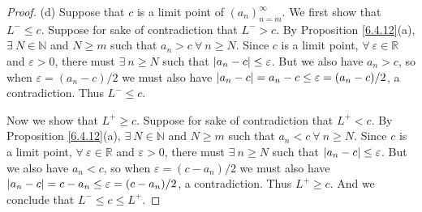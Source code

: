 \begin{proof}{(d)}
Suppose that \(c\) is a limit point of \((a_n)_{n = m}^\infty\).
We first show that \(L^- \leq c\).
Suppose for sake of contradiction that \(L^- > c\).
By Proposition \ref{6.4.12}(a), \(\exists\ N \in \mathds{N}\) and \(N \geq m\) such that \(a_n > c \ \forall\ n \geq N\).
Since \(c\) is a limit point, \(\forall\ \varepsilon \in \mathds{R}\) and \(\varepsilon > 0\), there must \(\exists\ n \geq N\) such that \(\abs*{a_n - c} \leq \varepsilon\).
But we also have \(a_n > c\), so when \(\varepsilon = (a_n - c) / 2\) we must also have \(\abs*{a_n - c} = a_n - c \leq \varepsilon = (a_n - c) / 2\), a contradiction.
Thus \(L^- \leq c\).

Now we show that \(L^+ \geq c\).
Suppose for sake of contradiction that \(L^+ < c\).
By Proposition \ref{6.4.12}(a), \(\exists\ N \in \mathds{N}\) and \(N \geq m\) such that \(a_n < c \ \forall\ n \geq N\).
Since \(c\) is a limit point, \(\forall\ \varepsilon \in \mathds{R}\) and \(\varepsilon > 0\), there must \(\exists\ n \geq N\) such that \(\abs*{a_n - c} \leq \varepsilon\).
But we also have \(a_n < c\), so when \(\varepsilon = (c - a_n) / 2\) we must also have \(\abs*{a_n - c} = c - a_n \leq \varepsilon = (c - a_n) / 2\), a contradiction.
Thus \(L^+ \geq c\).
And we conclude that \(L^- \leq c \leq L^+\).
\end{proof}

